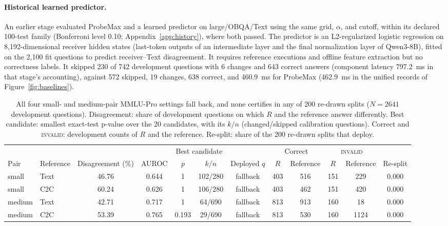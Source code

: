 \paragraph{Historical learned predictor.} An earlier stage evaluated ProbeMax and a learned predictor on large/OBQA/Text using the same grid, $\alpha$, and cutoff, within its declared 100-test family (Bonferroni level 0.10; Appendix~\ref{app:history}), where both passed. The predictor is an L2-regularized logistic regression on 8,192-dimensional receiver hidden states (last-token outputs of an intermediate layer and the final normalization layer of Qwen3-8B), fitted on the 2,100 fit questions to predict receiver--Text disagreement. It requires reference executions and offline feature extraction but no correctness labels. It skipped 230 of 742 development questions with 6 changes and 643 correct answers (component latency 797.2~ms in that stage's accounting), against 572 skipped, 19 changes, 638 correct, and 460.9~ms for ProbeMax (462.9~ms in the unified records of Figure~\ref{fig:baselines}).

\begin{table}[!htbp]\centering\scriptsize
\caption{All four small- and medium-pair MMLU-Pro settings fall back, and none certifies in any of 200 re-drawn splits ($N=2641$ development questions). Disagreement: share of development questions on which $R$ and the reference answer differently. Best candidate: smallest exact-test p-value over the 20 candidates, with its $k/n$ (changed/skipped calibration questions). Correct and \textsc{invalid}: development counts of $R$ and the reference. Re-split: share of the 200 re-drawn splits that deploy.}
\label{tab:mmlu_small_medium}
\renewcommand{\arraystretch}{1.1}\setlength{\tabcolsep}{2.5pt}
\begin{tabular*}{\linewidth}{@{}ll@{\hspace{5pt}\extracolsep{\fill}}cccccccccc@{}}\toprule
& & & & \multicolumn{2}{c}{Best candidate} & & \multicolumn{2}{c}{Correct} & \multicolumn{2}{c}{\textsc{invalid}} & \\\cmidrule(lr){5-6}\cmidrule(lr){8-9}\cmidrule(lr){10-11}
Pair & Reference & Disagreement (\%) & AUROC & $p$ & $k/n$ & Deployed $q$ & $R$ & Reference & $R$ & Reference & Re-split\\\midrule
small & Text & 46.76 & 0.644 & 1 & 102/280 & fallback & 403 & 516 & 151 & 229 & 0.000\\
small & C2C & 60.24 & 0.626 & 1 & 106/280 & fallback & 403 & 462 & 151 & 420 & 0.000\\
medium & Text & 42.71 & 0.717 & 1 & 64/690 & fallback & 813 & 913 & 160 & 18 & 0.000\\
medium & C2C & 53.39 & 0.765 & 0.193 & 29/690 & fallback & 813 & 530 & 160 & 1124 & 0.000\\\bottomrule
\end{tabular*}
\end{table}


